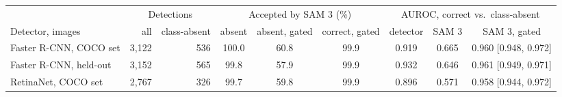 \begin{tabular}{@{}lrr ccc ccc@{}}
\toprule
 & \multicolumn{2}{c}{Detections} & \multicolumn{3}{c}{Accepted by SAM 3 (\%)} & \multicolumn{3}{c}{AUROC, correct vs.\ class-absent} \\
\cmidrule(lr){2-3}\cmidrule(lr){4-6}\cmidrule(l){7-9}
Detector, images & all & class-absent & absent & absent, gated & correct, gated & detector & SAM 3 & SAM 3, gated \\
\midrule
Faster R-CNN, COCO set & 3,122 & 536 & 100.0 & 60.8 & 99.9 & 0.919 & 0.665 & 0.960 {\scriptsize[0.948, 0.972]} \\
Faster R-CNN, held-out & 3,152 & 565 & 99.8 & 57.9 & 99.9 & 0.932 & 0.646 & 0.961 {\scriptsize[0.949, 0.971]} \\
RetinaNet, COCO set & 2,767 & 326 & 99.7 & 59.8 & 99.9 & 0.896 & 0.571 & 0.958 {\scriptsize[0.944, 0.972]} \\
\bottomrule
\end{tabular}
